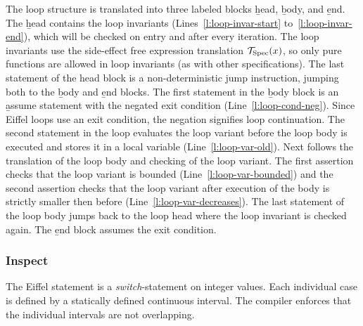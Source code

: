 The loop structure is translated into three labeled blocks \b{head}, \b{body}, and \b{end}. The \b{head} contains the loop invariants (Lines~\ref{l:loop-invar-start} to~\ref{l:loop-invar-end}), which will be checked on entry and after every iteration. The loop invariants use the side-effect free expression translation $\ts{Spec}{x}$, so only pure functions are allowed in loop invariants (as with other specifications).
The last statement of the head block is a non-deterministic jump instruction, jumping both to the \b{body} and \b{end} blocks. The first statement in the \b{body} block is an \b{assume} statement with the negated exit condition (Line~\ref{l:loop-cond-neg}). Since Eiffel loops use an  exit condition, the negation signifies loop continuation. The second statement in the loop evaluates the loop variant before the loop body is executed and stores it in a local variable (Line~\ref{l:loop-var-old}). Next follows the translation of the loop body and checking of the loop variant. The first assertion checks that the loop variant is bounded (Line~\ref{l:loop-var-bounded}) and the second assertion checks that the loop variant after execution of the body is strictly smaller then before (Line~\ref{l:loop-var-decreases}). The last statement of the loop body jumps back to the loop head where the loop invariant is checked again. The \b{end} block assumes the exit condition.


\subsubsection{Inspect}

The Eiffel  statement is a \emph{switch}-statement on integer values. Each individual case is defined by a statically defined continuous interval. The compiler enforces that the individual intervals are not overlapping.

